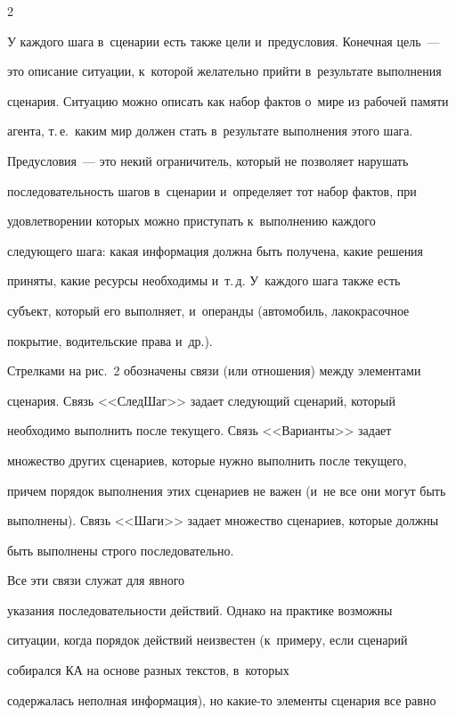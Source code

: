   \begin{multicols}{2}

  

  У каждого шага в~сценарии есть также цели и~предусловия. Конечная цель~--- 

это описание ситуации, к~которой желательно прийти в~результате выполнения 

сценария. Ситуацию можно описать как набор фактов о~мире из рабочей памяти 

агента, т.\,е.\ каким мир должен стать в~результате выполнения этого шага. 

Предусловия~--- это некий ограничитель, который не позволяет нарушать 

последовательность шагов в~сценарии и~определяет тот набор фактов, при 

удовлетворении которых можно приступать к~выполнению каждого 

сле\-ду\-юще\-го шага: какая информация должна быть получена, какие решения 

приняты, какие ресурсы необходимы и~т.\,д. У~каждого шага также есть 

субъект, который его выполняет, и~операнды (автомобиль, лакокрасочное 

покрытие, водительские права и~др.). 

  

  Стрелками на рис.~2 обозначены связи (или отношения) между элементами 

сценария. Связь <<СледШаг>> задает следующий сценарий, который 

необходимо выполнить после текущего. Связь <<Варианты>> задает 

множество других сценариев, которые нужно выполнить после текущего, 

причем порядок выполнения этих сценариев не важен (и~не все они могут быть 

выполнены). Связь <<Шаги>> задает множество сценариев, которые должны 

быть выполнены строго последовательно. 



Все эти связи служат для явного 

указания последовательности действий. Однако на практике возможны 

ситуации, когда порядок действий неизвестен (к~примеру, если сценарий 

собирался КА на основе разных текс\-тов, в~которых 

содержалась неполная информация), но ка\-кие-то элементы сценария все равно 


\end{multicols}
